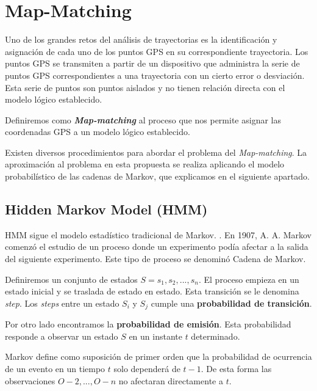 \section{Map-Matching}\label{section: MapMatching}
Uno de los grandes retos del análisis de trayectorias es la identificación y asignación de cada uno de los puntos GPS en su correspondiente trayectoria. Los puntos GPS se transmiten a partir de un dispositivo que administra la serie de puntos GPS correspondientes a una trayectoria con un cierto error o desviación. Esta serie de puntos son puntos aislados y no tienen relación directa con el modelo lógico establecido.
\begin{center}
Definiremos como \textbf{\textit{Map-matching}} al proceso que nos permite asignar las coordenadas GPS a un modelo lógico establecido.
\end{center}
Existen diversos procedimientos para abordar el problema del \textit{Map-matching}. La 
aproximación al problema en esta propuesta se realiza aplicando el modelo probabilístico de las 
cadenas de Markov, que explicamos en el siguiente apartado.

\subsection{Hidden Markov Model (\ac{HMM})}
\ac{HMM} sigue el modelo estadístico tradicional de Markov. \cite{Malvar08}. En 1907, A. A. Markov 
comenzó el estudio de un proceso donde un experimento podía afectar a la salida del siguiente 
experimento. Este tipo de proceso se denominó Cadena de Markov. 

Definiremos un conjunto de estados $ S = {s_{1}, s_{2}, . . . , s_{n}}. $ El proceso empieza en un estado inicial y se traslada de estado en estado. Esta transición se le denomina \textit{step}. Los \textit{steps} entre un estado $S_{i}$  y $S_{j}$ cumple una \textbf{probabilidad de transición}.

Por otro lado encontramos la \textbf{probabilidad de emisión}. Esta probabilidad responde a observar un estado $S$ en un instante $t$ determinado.

Markov define como suposición de primer orden que la probabilidad de ocurrencia de un evento en un tiempo $t$ solo dependerá de $t-1$. De esta forma las observaciones ${O-2,..., O-n}$ no 
afectaran directamente a $t$.


